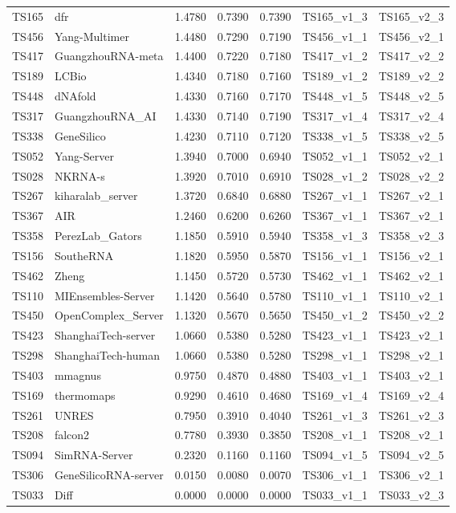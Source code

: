 \begin{table}[ht]
{\begin{tabular}{llrrrll}
TS165 & dfr & 1.4780 & 0.7390 & 0.7390 & TS165\_v1\_3 & TS165\_v2\_3 \\ 
TS456 & Yang-Multimer & 1.4480 & 0.7290 & 0.7190 & TS456\_v1\_1 & TS456\_v2\_1 \\ 
TS417 & GuangzhouRNA-meta & 1.4400 & 0.7220 & 0.7180 & TS417\_v1\_2 & TS417\_v2\_2 \\ 
TS189 & LCBio & 1.4340 & 0.7180 & 0.7160 & TS189\_v1\_2 & TS189\_v2\_2 \\ 
TS448 & dNAfold & 1.4330 & 0.7160 & 0.7170 & TS448\_v1\_5 & TS448\_v2\_5 \\ 
TS317 & GuangzhouRNA\_AI & 1.4330 & 0.7140 & 0.7190 & TS317\_v1\_4 & TS317\_v2\_4 \\ 
TS338 & GeneSilico & 1.4230 & 0.7110 & 0.7120 & TS338\_v1\_5 & TS338\_v2\_5 \\ 
TS052 & Yang-Server & 1.3940 & 0.7000 & 0.6940 & TS052\_v1\_1 & TS052\_v2\_1 \\ 
TS028 & NKRNA-s & 1.3920 & 0.7010 & 0.6910 & TS028\_v1\_2 & TS028\_v2\_2 \\ 
TS267 & kiharalab\_server & 1.3720 & 0.6840 & 0.6880 & TS267\_v1\_1 & TS267\_v2\_1 \\ 
TS367 & AIR & 1.2460 & 0.6200 & 0.6260 & TS367\_v1\_1 & TS367\_v2\_1 \\ 
TS358 & PerezLab\_Gators & 1.1850 & 0.5910 & 0.5940 & TS358\_v1\_3 & TS358\_v2\_3 \\ 
TS156 & SoutheRNA & 1.1820 & 0.5950 & 0.5870 & TS156\_v1\_1 & TS156\_v2\_1 \\ 
TS462 & Zheng & 1.1450 & 0.5720 & 0.5730 & TS462\_v1\_1 & TS462\_v2\_1 \\ 
TS110 & MIEnsembles-Server & 1.1420 & 0.5640 & 0.5780 & TS110\_v1\_1 & TS110\_v2\_1 \\ 
TS450 & OpenComplex\_Server & 1.1320 & 0.5670 & 0.5650 & TS450\_v1\_2 & TS450\_v2\_2 \\ 
TS423 & ShanghaiTech-server & 1.0660 & 0.5380 & 0.5280 & TS423\_v1\_1 & TS423\_v2\_1 \\ 
TS298 & ShanghaiTech-human & 1.0660 & 0.5380 & 0.5280 & TS298\_v1\_1 & TS298\_v2\_1 \\ 
TS403 & mmagnus & 0.9750 & 0.4870 & 0.4880 & TS403\_v1\_1 & TS403\_v2\_1 \\ 
TS169 & thermomaps & 0.9290 & 0.4610 & 0.4680 & TS169\_v1\_4 & TS169\_v2\_4 \\ 
TS261 & UNRES & 0.7950 & 0.3910 & 0.4040 & TS261\_v1\_3 & TS261\_v2\_3 \\ 
TS208 & falcon2 & 0.7780 & 0.3930 & 0.3850 & TS208\_v1\_1 & TS208\_v2\_1 \\ 
TS094 & SimRNA-Server & 0.2320 & 0.1160 & 0.1160 & TS094\_v1\_5 & TS094\_v2\_5 \\ 
TS306 & GeneSilicoRNA-server & 0.0150 & 0.0080 & 0.0070 & TS306\_v1\_1 & TS306\_v2\_1 \\ 
TS033 & Diff & 0.0000 & 0.0000 & 0.0000 & TS033\_v1\_1 & TS033\_v2\_3 \\ 
\bottomrule
\end{tabular}%
}
\end{table}
